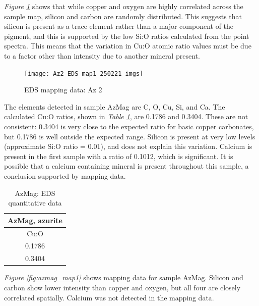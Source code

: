 \textit{Figure \ref{fig:az2_map1}} shows that while copper and oxygen are highly correlated across the sample map, silicon and carbon are randomly distributed. This suggests that silicon is present as a trace element rather than a major component of the pigment, and this is supported by the low Si:O ratios calculated from the point spectra. This means that the variation in Cu:O atomic ratio values must be due to a factor other than intensity due to another mineral present.

\begin{figure}[H]
\centering
  \texttt{[image: Az2\_EDS\_map1\_250221\_imgs]}
\caption[EDS mapping data: Az 2]{EDS mapping data: Az 2}
\label{fig:az2_map1}
\end{figure}


The elements detected in sample AzMag are C, O, Cu, Si, and Ca. The calculated Cu:O ratios, shown in \textit{Table \ref{table:azmag_ratios}}, are 0.1786 and 0.3404. These are not consistent: 0.3404 is very close to the expected ratio for basic copper carbonates, but 0.1786 is well outside the expected range. Silicon is present at very low levels (approximate Si:O ratio = 0.01), and does not explain this variation. Calcium is present in the first sample with a ratio of 0.1012, which is significant. It is possible that a calcium containing mineral is present throughout this sample, a conclusion supported by mapping data.

\begin{table}[H]
\caption{AzMag: EDS quantitative data}
\centering
\label{table:azmag_ratios}
\begin{tabular}{c }
\toprule
AzMag, azurite \\
\midrule
Cu:O \\
\midrule
0.1786 \\
0.3404 \\
\bottomrule
\end{tabular}
\end{table}

\textit{Figure \ref{fig:azmag_map1}} shows mapping data for sample AzMag. Silicon and carbon show lower intensity than copper and oxygen, but all four are closely correlated spatially. Calcium was not detected in the mapping data.

